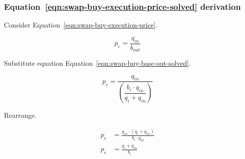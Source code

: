 \documentclass[table, twocolumn]{article}
\begin{document}
\subsubsection{Equation~\ref{eqn:swap-buy-execution-price-solved} derivation}%
\label{sssec:equation-eqn-swap-buy-execution-price-solved-derivation}

Consider Equation~\ref{eqn:swap-buy-execution-price}.

\begin{equation}
  p_e = \frac{q_{in}}{b_{out}} \nonumber
\end{equation}

Substitute equation Equation~\ref{eqn:swap-buy-base-out-solved}.

\begin{equation}
  p_e = \frac{q_{in}}{\left(\dfrac{b_i \cdot q_{in}}{q_i + q_{in}}\right)} \nonumber
\end{equation}

Rearrange.

\begin{align}
  p_e &= \frac{q_{in} \cdot (q_i + q_{in})}{b_i \cdot q_{in}} \nonumber \\
  p_e &= \frac{q_i + q_{in}}{b_i} \nonumber \\
\end{align}
\end{document}
